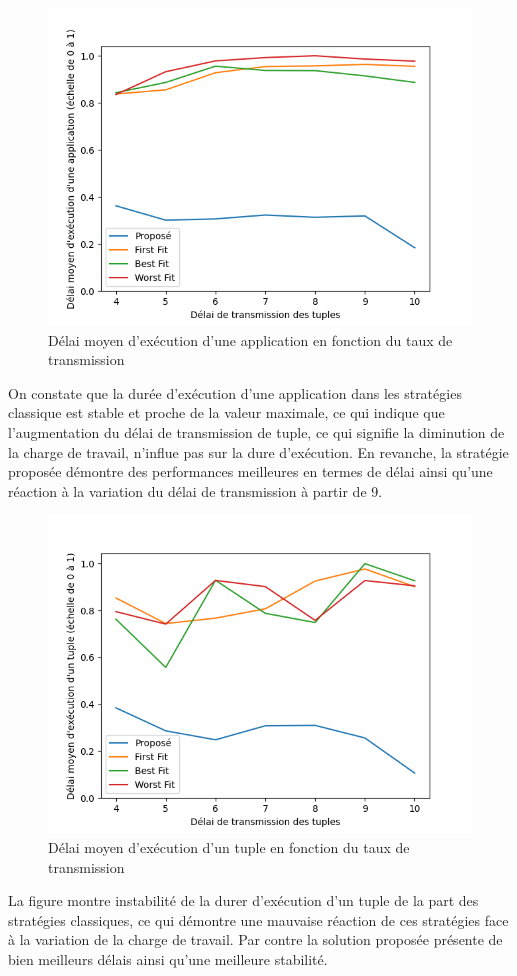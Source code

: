 \begin{figure}[H]
    \centering
    \includegraphics[]{src/ressources/loopDelayPerTransmitRate.png}
    \caption{Délai moyen d'exécution d’une application en fonction du taux de transmission}
    \label{fig:}
\end{figure}
On constate que la durée d'exécution d'une application dans les stratégies classique est stable et proche de la valeur maximale, ce qui indique que l'augmentation du délai de transmission de tuple, ce qui signifie la diminution de la charge de travail, n'influe pas sur la dure d'exécution. En revanche, la stratégie proposée démontre des performances meilleures en termes de délai ainsi qu'une réaction à la variation du délai de transmission à partir de 9. 


\begin{figure}[H]
    \centering
    \includegraphics[]{src/ressources/tupleDelayPerTransmitRate.png}
    \caption{Délai moyen d'exécution d’un tuple en fonction du taux de transmission}
    \label{fig:}
\end{figure}
La figure montre instabilité de la durer d'exécution d'un tuple de la part des stratégies classiques, ce qui démontre une mauvaise réaction de ces stratégies face à la variation de la charge de travail. Par contre la solution proposée présente de bien meilleurs délais ainsi qu'une meilleure stabilité. 
